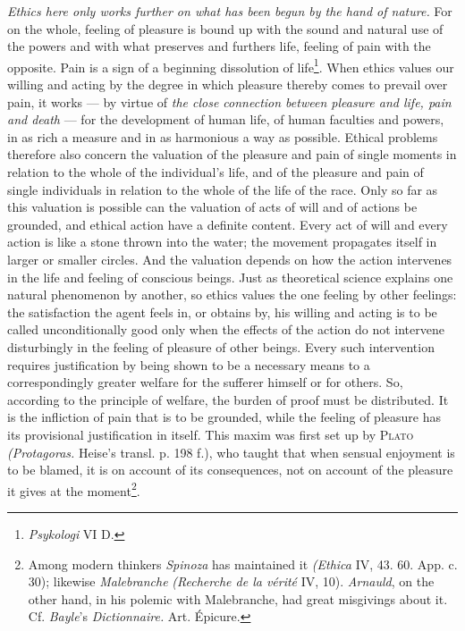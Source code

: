 \documentclass[12pt,a4paper,openany]{book}
\newcommand{\opage}[1]{\marginnote{\footnotesize\textit{[#1]}}}
\begin{document}
\textit{Ethics here only works further on what has been begun by the hand of nature.} For on the whole,
feeling of pleasure is bound up with the sound and natural use of the powers and with what preserves and
furthers life, feeling of pain with the opposite. Pain is a sign of a beginning dissolution of
life\footnote[1]{\textit{Psykologi} VI D.}. When ethics values our willing and acting by the degree in
which pleasure thereby comes to prevail over pain, it works --- by virtue of \textit{the close connection
between pleasure and life, pain and death} --- for the development of human life, of human faculties and
powers, in as rich a measure and in as harmonious a way as possible. Ethical problems therefore also
concern the valuation of the pleasure and pain of single moments in relation to the whole of the
individual's life, and of the pleasure and pain of single individuals in relation to the whole of the life
of the race. Only so far as this valuation is possible can the valuation of acts of will and of actions be
grounded, and ethical action have a definite content. Every act of will and every action is like a stone
thrown into the water; the movement propagates itself in larger or smaller circles. And the valuation
depends on how the action intervenes in the life and feeling of conscious beings. Just as theoretical
science explains one natural phenomenon by another, so ethics values the one feeling by other feelings:
the satisfaction the agent feels in, or obtains by, his
\opage{137}willing and acting is to be called unconditionally good only when the effects of the action do not
intervene disturbingly in the feeling of pleasure of other beings. Every such intervention requires
justification by being shown to be a necessary means to a correspondingly greater welfare for the sufferer
himself or for others. So, according to the principle of welfare, the burden of proof must be distributed.
It is the infliction of pain that is to be grounded, while the feeling of pleasure has its provisional
justification in itself. This maxim was first set up by \textsc{Plato} \textit{(Protagoras.} Heise's
transl. p. 198 f.), who taught that when sensual enjoyment is to be blamed, it is on account of its
consequences, not on account of the pleasure it gives at the moment\footnote[1]{Among modern thinkers
\emph{Spinoza} has maintained it \textit{(Ethica} IV, 43. 60. App. c. 30); likewise \emph{Malebranche}
\textit{(Recherche de la vérité} IV, 10). \emph{Arnauld}, on the other hand, in his polemic with
Malebranche, had great misgivings about it. Cf. \emph{Bayle}'s \textit{Dictionnaire.} Art. Épicure.}.
\end{document}
